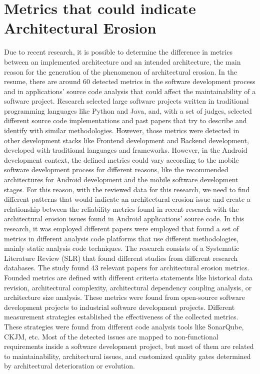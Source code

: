 \section{Metrics that could indicate Architectural Erosion}
Due to recent research, it is possible to determine the difference in metrics between an implemented architecture and an intended architecture, the main reason for the generation of the phenomenon of architectural erosion. In the resume, there are around 60 detected metrics in the software development process and in applications' source code analysis that could affect the maintainability of a software project. Research selected large software projects written in traditional programming languages like Python and Java, and, with a set of judges, selected different source code implementations and past papers that try to describe and identify with similar methodologies. However, those metrics were detected in other development stacks like Frontend development and Backend development, developed with traditional languages and frameworks. However, in the Android development context, the defined metrics could vary according to the mobile software development process for different reasons, like the recommended architectures for Android development and the mobile software development stages. For this reason, with the reviewed data for this research, we need to find different patterns that would indicate an architectural erosion issue and create a relationship between the reliability metrics found in recent research with the architectural erosion issues found in Android applications' source code.
In this research, it was employed different papers were employed that found a set of metrics in different analysis code platforms that use different methodologies, mainly static analysis code techniques. The research consists of a Systematic Literature Review (SLR) that found different studies from different research databases. The study found 43 relevant papers for architectural erosion metrics. Founded metrics are defined with different criteria statements like historical data revision, architectural complexity, architectural dependency coupling analysis, or architecture size analysis. These metrics were found from open-source software development projects to industrial software development projects.
Different measurement strategies established the effectiveness of the collected metrics. These strategies were found from different code analysis tools like SonarQube, CKJM, etc. Most of the detected issues are mapped to non-functional requirements inside a software development project, but most of them are related to maintainability, architectural issues, and customized quality gates determined by architectural deterioration or evolution.

